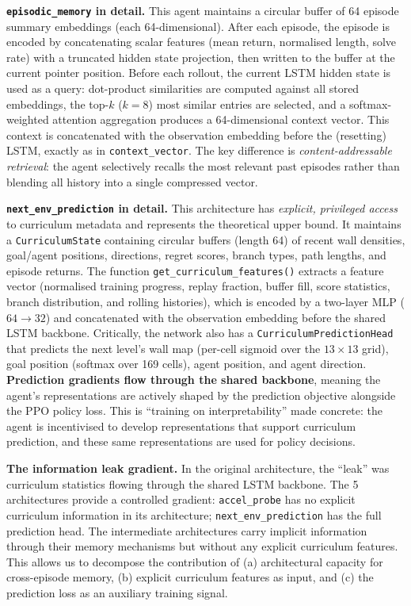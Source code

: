 \documentclass[11pt,a4paper]{article}
\theoremstyle{remark}
\begin{document}
\textbf{\texttt{episodic\_memory} in detail.} This agent maintains a circular buffer of 64 episode summary embeddings (each 64-dimensional). After each episode, the episode is encoded by concatenating scalar features (mean return, normalised length, solve rate) with a truncated hidden state projection, then written to the buffer at the current pointer position. Before each rollout, the current LSTM hidden state is used as a query: dot-product similarities are computed against all stored embeddings, the top-$k$ ($k = 8$) most similar entries are selected, and a softmax-weighted attention aggregation produces a 64-dimensional context vector. This context is concatenated with the observation embedding before the (resetting) LSTM, exactly as in \texttt{context\_vector}. The key difference is \textit{content-addressable retrieval}: the agent selectively recalls the most relevant past episodes rather than blending all history into a single compressed vector.

\textbf{\texttt{next\_env\_prediction} in detail.} This architecture has \textit{explicit, privileged access} to curriculum metadata and represents the theoretical upper bound. It maintains a \texttt{CurriculumState} containing circular buffers (length 64) of recent wall densities, goal/agent positions, directions, regret scores, branch types, path lengths, and episode returns. The function \texttt{get\_curriculum\_features()} extracts a feature vector (normalised training progress, replay fraction, buffer fill, score statistics, branch distribution, and rolling histories), which is encoded by a two-layer MLP ($64 \to 32$) and concatenated with the observation embedding before the shared LSTM backbone. Critically, the network also has a \texttt{CurriculumPredictionHead} that predicts the next level's wall map (per-cell sigmoid over the $13 \times 13$ grid), goal position (softmax over 169 cells), agent position, and agent direction. \textbf{Prediction gradients flow through the shared backbone}, meaning the agent's representations are actively shaped by the prediction objective alongside the PPO policy loss. This is ``training on interpretability'' made concrete: the agent is incentivised to develop representations that support curriculum prediction, and these same representations are used for policy decisions.

\textbf{The information leak gradient.} In the original architecture, the ``leak'' was curriculum statistics flowing through the shared LSTM backbone. The 5 architectures provide a controlled gradient: \texttt{accel\_probe} has no explicit curriculum information in its architecture; \texttt{next\_env\_prediction} has the full prediction head. The intermediate architectures carry implicit information through their memory mechanisms but without any explicit curriculum features. This allows us to decompose the contribution of (a) architectural capacity for cross-episode memory, (b) explicit curriculum features as input, and (c) the prediction loss as an auxiliary training signal.
\end{document}
